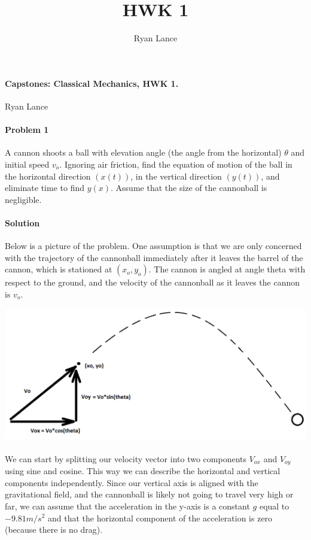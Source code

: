\documentclass[11pt,a4paper]{report}
\author{Ryan Lance}
\title{HWK 1}
\begin{document}
\paragraph{Capstones: Classical Mechanics, HWK 1.} Ryan Lance
\paragraph{Problem 1} A cannon shoots a ball with elevation angle (the angle from the horizontal) $\theta$ and initial speed $v_o$. Ignoring air friction, find the equation of motion of the ball in the horizontal direction $(x(t))$, in the vertical direction $(y(t))$, and eliminate time to find $y(x)$. Assume that the size of the cannonball is negligible.
\paragraph{Solution} Below is a picture of the problem. One assumption is that we are only concerned with the trajectory of the cannonball immediately after it leaves the barrel of the cannon, which is stationed at $(x_o, y_o)$. The cannon is angled at angle theta with respect to the ground, and the velocity of the cannonball as it leaves the cannon is $v_o$. 
\begin{center}
\includegraphics[scale=0.4]{projectile}
\end{center}
\paragraph{} We can start by splitting our velocity vector into two components $V_{ox}$ and $V_{oy}$ using sine and cosine. This way we can describe the horizontal and vertical components independently. Since our vertical axis is aligned with the gravitational field, and the cannonball is likely not going to travel very high or far, we can assume that the acceleration in the y-axis is a constant $g$ equal to $-9.81m/s^2$ and that the horizontal component of the acceleration is zero (because there is no drag). 
\end{document}
